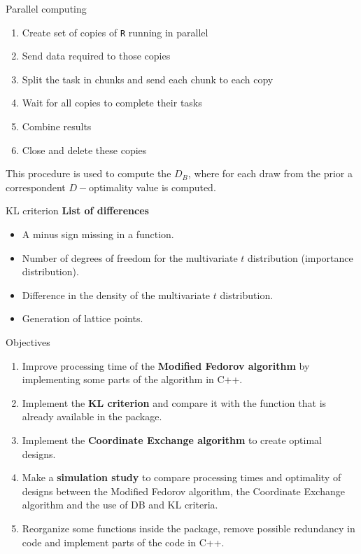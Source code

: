 \documentclass[11pt,t]{beamer}
\begin{document}
\begin{frame}[fragile]{Parallel computing}
\begin{enumerate}
	\item Create set of copies of \texttt{R} running in parallel
	\item Send data required to those copies
	\item Split the task in chunks and send each chunk to each copy
	\item Wait for all copies to complete their tasks
	\item Combine results
	\item Close and delete these copies
\end{enumerate}
\begin{block}{}
	This procedure is used to compute the $D_B$, where for each draw from the prior a correspondent $D-$optimality value is computed.
\end{block}
\end{frame}

\begin{frame}[noframenumbering]{KL criterion}
\textbf{List of differences}
\begin{itemize}
	\item A minus sign missing in a function. \textcolor{red}{\checkmark}
	\item Number of degrees of freedom for the multivariate $t$ distribution (importance distribution). \textcolor{red}{\checkmark}
	\item Difference in the density of the multivariate $t$ distribution.
	\item Generation of lattice points.
\end{itemize}
\end{frame}

\begin{frame}[noframenumbering]{Objectives}
	\begin{enumerate}
		\item Improve processing time of the \textbf{Modified Fedorov algorithm} by implementing some parts of the algorithm in C++. \textcolor{red}{\checkmark} %
		\item Implement the \textbf{KL criterion} and compare it with the function that is already available in the package. \textcolor{red}{\checkmark} %
		\item \textcolor{kul-blue}{Implement the \textbf{Coordinate Exchange algorithm} to create optimal designs.} %
		\item Make a \textbf{simulation study} to compare processing times and optimality of designs between the Modified Fedorov algorithm, the Coordinate Exchange algorithm and the use of DB and KL criteria. %
		\item Reorganize some functions inside the package, remove possible redundancy in code and implement parts of the code in C++. \textcolor{red}{\checkmark}
	\end{enumerate}
\end{frame}
\end{document}
